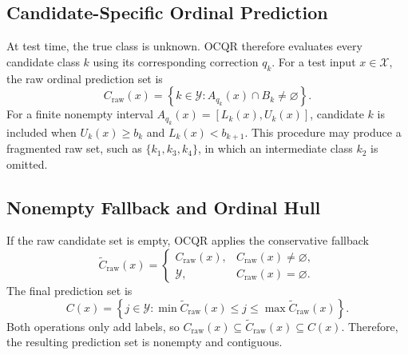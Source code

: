 \documentclass[conference]{IEEEtran}
\begin{document}
\subsection{Candidate-Specific Ordinal Prediction}
\label{subsec:candidate_prediction}
At test time, the true class is unknown. OCQR therefore evaluates every candidate class \(k\) using its corresponding correction \(q_k\). For a test input \(x\in\mathcal{X}\), the raw ordinal prediction set is
\begin{equation}
C_{\mathrm{raw}}(x)
=
\left\{
k\in\mathcal{Y}:
A_{q_k}(x)\cap B_k\neq\varnothing
\right\}.
\label{eq:raw_set}
\end{equation}
For a finite nonempty interval \(A_{q_k}(x)=[L_k(x),U_k(x)]\), candidate \(k\) is included when \(U_k(x)\ge b_k\) and \(L_k(x)<b_{k+1}\). This procedure may produce a fragmented raw set, such as \(\{k_1,k_3,k_4\}\), in which an intermediate class \(k_2\) is omitted.

\subsection{Nonempty Fallback and Ordinal Hull}
\label{subsec:ordinal_hull}
If the raw candidate set is empty, OCQR applies the conservative fallback
\begin{equation}
\widetilde C_{\mathrm{raw}}(x)
=
\begin{cases}
C_{\mathrm{raw}}(x),
&
C_{\mathrm{raw}}(x)\neq\varnothing, \\[3pt]
\mathcal{Y},
&
C_{\mathrm{raw}}(x)=\varnothing.
\end{cases}
\label{eq:empty_fallback}
\end{equation}
The final prediction set is 
\begin{equation}
C(x)
=
\left\{
j\in\mathcal{Y}:
\min\widetilde C_{\mathrm{raw}}(x)\le j\le\max \widetilde C_{\mathrm{raw}}(x)
\right\}.
\label{eq:final_prediction_set}
\end{equation}
Both operations only add labels, so \(C_{\mathrm{raw}}(x)\subseteq\widetilde C_{\mathrm{raw}}(x)\subseteq C(x)\). Therefore, the resulting prediction set is nonempty and contiguous.
\end{document}
